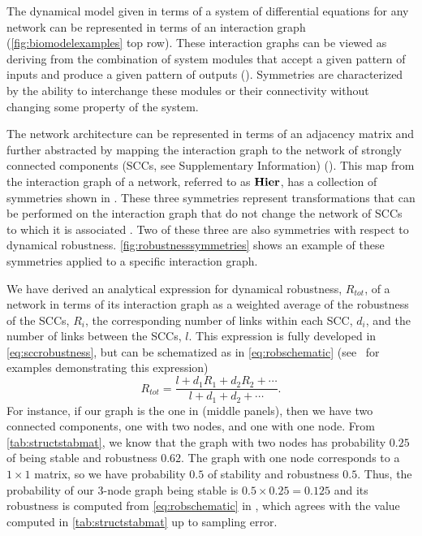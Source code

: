 
The dynamical model given in terms of a system of differential equations for any network can be represented in terms of an interaction graph (\ref{fig:biomodelexamples} top row). These interaction graphs can be viewed as deriving from the combination of system modules that accept a given pattern of inputs and produce a given pattern of outputs (). Symmetries are characterized by the ability to interchange these modules or their connectivity without changing some property of the system.

The network architecture can be represented in terms of an adjacency matrix and further abstracted by mapping the interaction graph to the network of strongly connected components (SCCs, see Supplementary Information) (). This map from the interaction graph of a network, referred to as $\mathbf{Hier}$, has a collection of symmetries shown in . These three symmetries represent transformations that can be performed on the interaction graph that do not change the network of SCCs to which it is associated . Two of these three are also symmetries with respect to dynamical robustness. \ref{fig:robustnesssymmetries} shows an example of these symmetries applied to a specific interaction graph.

We have derived an analytical expression for dynamical robustness, $R_{tot}$, of a network in terms of its interaction graph as a weighted average of the robustness of the SCCs, $R_i$, the corresponding number of links within each SCC, $d_i$, and the number of links between the SCCs, $l$. This expression is fully developed in \ref{eq:sccrobustness}, but can be schematized as in \ref{eq:robschematic} (see $\,$ for examples demonstrating this expression)
\begin{equation}\label{eq:robschematic}
R_{tot} = \frac{l+d_1 R_1 + d_2 R_2 + \cdots}{l+d_1 + d_2 + \cdots}.
\end{equation}
For instance, if our graph is the one in  (middle panels), then we have two connected components, one with two nodes, and one with one node.  From \ref{tab:structstabmat}, we know that the graph with two nodes has probability $0.25$ of being stable and robustness $0.62$.  The graph with one node corresponds to a $1 \times 1$ matrix, so we have probability $0.5$ of stability and robustness $0.5$.  Thus, the probability of our 3-node graph being stable is $0.5 \times 0.25 = 0.125$ and its robustness is computed from \ref{eq:robschematic} in , which agrees with the value computed in \ref{tab:structstabmat} up to sampling error.

